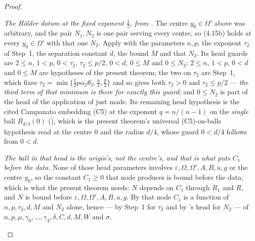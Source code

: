 \begin{proof}
\begin{enumerate}
  \emph{The H\"older datum at the fixed exponent $\tfrac12$, from
  .}  The centre $y_0\in\Omega'$ above was
  arbitrary, and the pair $N_1,N_2$ is one pair serving every centre, so
  (4.15b) holds at every $y_0\in\Omega'$ with that one $N_2$.  Apply
   with the parameters $n,p$, the exponent
  $\tau_2$ of Step~1, the separation constant $d$, the bound $M$ and that
  $N_2$.  Its head guards are $2\le n$, $1<p$, $0<\tau_2$, $\tau_2\le p/2$,
  $0<d$, $0\le M$ and $0\le N_2$: $2\le n$, $1<p$, $0<d$ and $0\le M$ are
  hypotheses of the present theorem; the two on $\tau_2$ are Step~1, which
  fixes $\tau_2=\min\{\tfrac12p\alpha_2\theta_2,\tfrac n2,\tfrac p2\}$ and so
  gives both $\tau_2>0$ and $\tau_2\le p/2$ --- \emph{the third term of that
  minimum is there for exactly this guard}; and $0\le N_2$ is part of the head
  of the application of  just made.  Its
  remaining head hypothesis is the cited Campanato embedding (C5) at the
  exponent $q=n/(n-1)$ on the \emph{single} ball $B_{d/4}(0)$
  (), which is the present theorem's universal
  (C5)-on-balls hypothesis read at the centre $0$ and the radius $d/4$, whose
  guard $0<d/4$ follows from $0<d$.

  \emph{The ball in that head is the origin's, not the centre's, and that is
  what puts $C_1$ before the data.}  None of those head parameters involves
  $\varepsilon,\Omega,\Omega',A,B,u,g$ or the centre $y_0$, so the constant
  $C_1\ge0$ that node produces is bound before the data, which is what the
  present theorem needs: $N$ depends on $C_1$ through $R_1$ and $R$, and $N$ is
  bound before $\varepsilon,\Omega,\Omega',A,B,u,g$.  By that node $C_1$ is a
  function of $n,p,\tau_2,d,M$ and $N_2$ alone, hence --- by Step~1 for
  $\tau_2$ and by 's head for $N_2$ --- of
  $n,p,\mu,\gamma_0,\dots,\gamma_4,\delta,C,d,M,W$ and $\sigma$.


\end{enumerate}
\end{proof}
